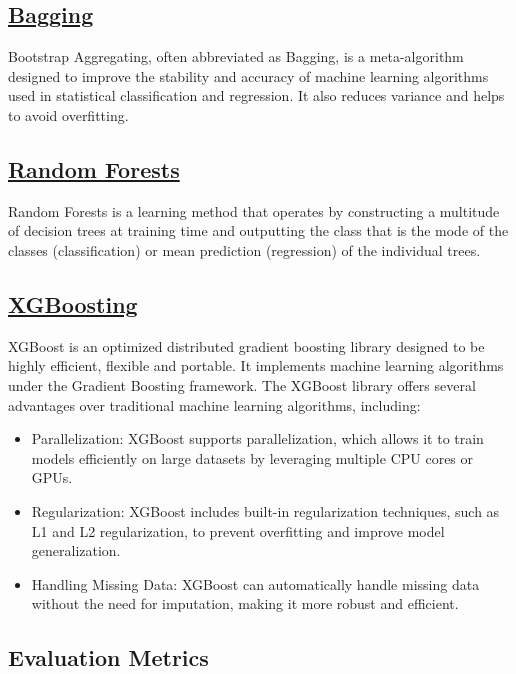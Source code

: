 \documentclass[conference]{IEEEtran}
\begin{document}
    \subsection{\href{https://en.wikipedia.org/wiki/Bootstrap_aggregating}{Bagging}}
    Bootstrap Aggregating, often abbreviated as Bagging, is a meta-algorithm designed to improve the stability and accuracy of machine learning algorithms used in statistical classification and regression. It also reduces variance and helps to avoid overfitting.
    \subsection{\href{https://en.wikipedia.org/wiki/Random_forest}{Random Forests}}
    Random Forests is a learning method that operates by constructing a multitude of decision trees at training time and outputting the class that is the mode of the classes (classification) or mean prediction (regression) of the individual trees.

    \subsection{\href{https://en.wikipedia.org/wiki/XGBoost}{XGBoosting}}
    XGBoost is an optimized distributed gradient boosting library designed to be highly efficient, flexible and portable. It implements machine learning algorithms under the Gradient Boosting framework. The XGBoost library offers several advantages over traditional machine learning algorithms, including:
        \begin{itemize}
        \item Parallelization: XGBoost supports parallelization, which allows it to train models efficiently on large datasets by leveraging multiple CPU cores or GPUs.
        \item Regularization: XGBoost includes built-in regularization techniques, such as L1 and L2 regularization, to prevent overfitting and improve model generalization.
        \item Handling Missing Data: XGBoost can automatically handle missing data without the need for imputation, making it more robust and efficient.
        \end{itemize}

    \subsection*{Evaluation Metrics}
\end{document}
